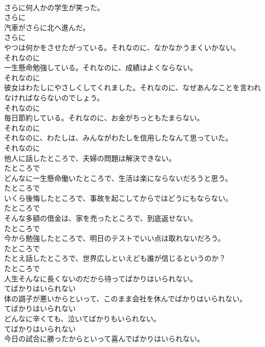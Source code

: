 \documentclass[8pt]{extreport}
\begin{document}
\begin{CJK}{UTF8}{min}
\\	さらに何人かの学生が笑った。	
\\	さらに
\\	汽車がさらに北へ進んだ。	
\\	さらに
\\	やつは何かをさせたがっている。それなのに、なかなかうまくいかない。	
\\	それなのに
\\	一生懸命勉強している。それなのに、成績はよくならない。	
\\	それなのに
\\	彼女はわたしにやさしくしてくれました。それなのに、なぜあんなことを言われなければならないのでしょう。	
\\	それなのに
\\	毎日節約している。それなのに、お金がちっともたまらない。	
\\	それなのに
\\	それなのに、わたしは、みんながわたしを信用したなんて思っていた。	
\\	それなのに
\\	他人に話したところで、夫婦の問題は解決できない。	
\\	たところで
\\	どんなに一生懸命働いたところで、生活は楽にならないだろうと思う。	
\\	たところで
\\	いくら後悔したところで、事故を起こしてからではどうにもならない。	
\\	たところで
\\	そんな多額の借金は、家を売ったところで、到底返せない。	
\\	たところで
\\	今から勉強したところで、明日のテストでいい点は取れないだろう。	
\\	たところで
\\	たとえ話したところで、世界広しといえども誰が信じるというのか？	
\\	たところで
\\	人生そんなに長くないのだから待ってばかりはいられない。	
\\	てばかりはいられない
\\	体の調子が悪いからといって、このまま会社を休んでばかりはいられない。	
\\	てばかりはいられない
\\	どんなに辛くても、泣いてばかりもいられない。	
\\	てばかりはいられない
\\	今日の試合に勝ったからといって喜んでばかりはいられない。	

\end{CJK}
\end{document}
